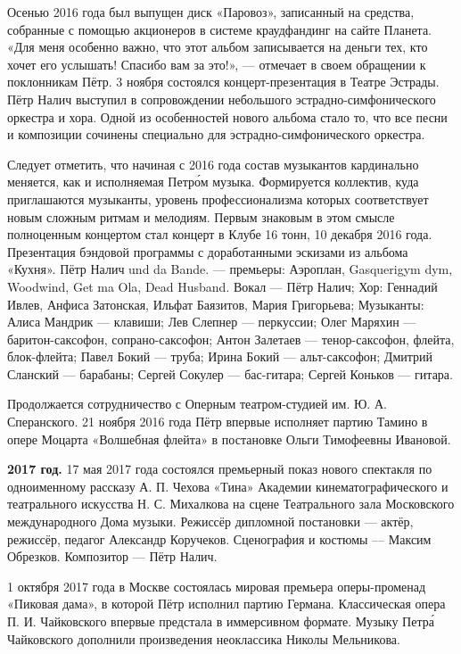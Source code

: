 Осенью 2016 года был выпущен диск «Паровоз», записанный на средства, собранные с помощью акционеров в системе краудфандинг на сайте Планета. «Для меня особенно важно, что этот альбом записывается на деньги тех, кто хочет его услышать! Спасибо вам за это!», --- отмечает в своем обращении к поклонникам Пётр. 3 ноября состоялся концерт-презентация в Театре Эстрады. Пётр Налич выступил в сопровождении небольшого эстрадно-симфонического оркестра и хора. Одной из особенностей нового альбома стало то, что все песни и композиции сочинены специально для эстрадно-симфонического оркестра.

Следует отметить, что начиная с 2016 года состав музыкантов кардинально меняется, как и исполняемая Петр\'{о}м музыка. Формируется коллектив, куда приглашаются музыканты, уровень профессионализма которых соответствует новым сложным ритмам и мелодиям. Первым знаковым в этом смысле полноценным концертом стал концерт в Клубе 16 тонн, 10 декабря 2016 года. Презентация бэндовой программы с доработанными эскизами из альбома «Кухня». Пётр Налич und da Bande. --- премьеры: Аэроплан, Gasquerigym dym, Woodwind, Get ma Ola, Dead Husband. Вокал --- Пётр Налич; Хор: Геннадий Ивлев, Анфиса Затонская, Ильфат Баязитов, Мария Григорьева; Музыканты: Алиса Мандрик --- клавиши; Лев Слепнер --- перкуссии; Олег Маряхин --- баритон-саксофон, сопрано-саксофон; Антон Залетаев --- тенор-саксофон, флейта, блок-флейта; Павел Бокий --- труба; Ирина Бокий --- альт-саксофон; Дмитрий Сланский --- барабаны; Сергей Сокулер --- бас-гитара; Сергей Коньков --- гитара.

Продолжается сотрудничество с Оперным театром-студией им. Ю. А. Сперанского. 21 ноября 2016 года Пётр впервые исполняет партию Тамино в опере Моцарта «Волшебная флейта» в постановке Ольги Тимофеевны Ивановой.



\textbf{2017 год.}
17 мая 2017 года состоялся премьерный показ нового спектакля по одноименному рассказу А. П. Чехова «Тина» Академии кинематографического и театрального искусства Н. С. Михалкова на сцене Театрального зала Московского международного Дома музыки. Режиссёр дипломной постановки --- актёр, режиссёр, педагог Александр Коручеков. Сценография и костюмы --- Максим Обрезков. Композитор --- Пётр Налич.

1 октября 2017 года в Москве состоялась мировая премьера оперы-променад «Пиковая дама», в которой Пётр исполнил партию Германа. Классическая опера П. И. Чайковского впервые предстала в иммерсивном формате. Музыку Петр\'{а} Чайковского дополнили произведения неоклассика Николы Мельникова.

